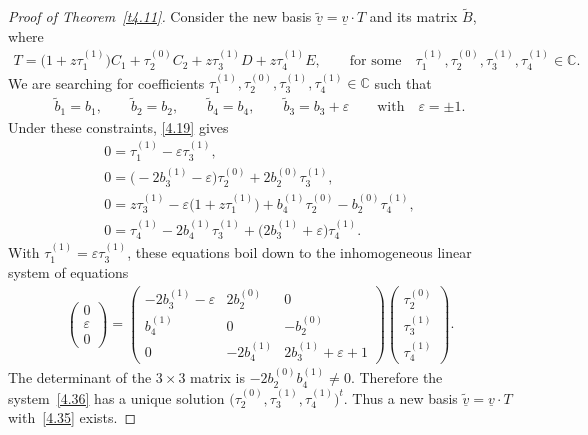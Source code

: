 \documentclass[pdftex]{sigma}%
\numberwithin{equation}{section}
\numberwithin{figure}{section}
\newcommand{\C}{{\mathbb C}}
\newcommand{\www}{\widetilde}
\newcommand{\uuuu}{\underline}
\begin{document}
\begin{proof}[Proof of Theorem~\ref{t4.11}]
Consider the new basis $\uuuu{\www v}=\uuuu{v}\cdot T$
and its matrix $\www B$, where
\begin{gather*}%
T=\big(1+z\tau_1^{(1)}\big)C_1+\tau_2^{(0)}C_2+z\tau_3^{(1)}D
+z\tau_4^{(1)}E,\qquad \text{for some}\quad
\tau_1^{(1)},\tau_2^{(0)},
\tau_3^{(1)},\tau_4^{(1)}\in\C.%
\end{gather*}
We are searching for coefficients
$\tau_1^{(1)},\tau_2^{(0)},\tau_3^{(1)},\tau_4^{(1)}\in\C$
such that
\begin{gather}\label{4.35}
\www b_1=b_1,\qquad
\www b_2=b_2,\qquad
\www b_4=b_4,\qquad
\www b_3=b_3+\varepsilon\qquad \text{with}\quad \varepsilon=\pm 1.
\end{gather}
Under these constraints,
\eqref{4.19} gives
\begin{gather*}
0= \tau_1^{(1)}-\varepsilon \tau_3^{(1)},
\\
0= \big({-}2b_3^{(1)}-\varepsilon\big)\tau_2^{(0)}+ 2b_2^{(0)}\tau_3^{(1)},
\\
0= z\tau_3^{(1)}-\varepsilon\big(1+z\tau_1^{(1)}\big)+b_4^{(1)}\tau_2^{(0)} -b_2^{(0)}\tau_4^{(1)},
\\
0=\tau_4^{(1)} -2b_4^{(1)}\tau_3^{(1)}+\big(2b_3^{(1)}+\varepsilon\big)\tau_4^{(1)}.
\end{gather*}
With $\tau_1^{(1)}=\varepsilon\tau_3^{(1)}$, these
equations boil down to the inhomogeneous linear system
of equations
\begin{gather}\label{4.36}
\begin{pmatrix}0\\ \varepsilon\\ 0 \end{pmatrix} =
\begin{pmatrix} -2b_3^{(1)}-\varepsilon & 2b_2^{(0)} & 0 \\
b_4^{(1)} & 0 & -b_2^{(0)} \\
0 & -2b_4^{(1)} & 2b_3^{(1)}+\varepsilon+1 \end{pmatrix}
\begin{pmatrix} \tau_2^{(0)}\\ \tau_3^{(1)}\\ \tau_4^{(1)}
\end{pmatrix}\!.
\end{gather}
The determinant of the $3\times 3$ matrix is
$-2 b_2^{(0)}b_4^{(1)}\neq 0$. Therefore the system~\eqref{4.36}
has a unique solution $\big(\tau_2^{(0)},\tau_3^{(1)},
\tau_4^{(1)}\big)^t$.
Thus a new basis $\uuuu{\www v}=\uuuu{v}\cdot T$
with~\eqref{4.35} exists.


\end{proof}
\end{document}
